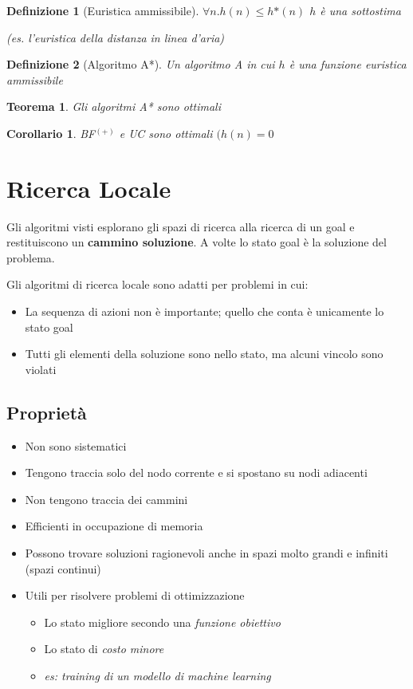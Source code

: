 \documentclass{article}
\newtheorem{definizione}{Definizione}
\newtheorem{theorem}{Teorema}
\newtheorem{corollary}{Corollario}
\begin{document}
\begin{definizione}[Euristica ammissibile]
$\forall n.h(n) \leq h\text{*}(n)$ \quad $h$ è una sottostima
\end{definizione}
\begin{center} \textit{(es. l'euristica della distanza in linea d'aria)}\end{center}
\begin{definizione}[Algoritmo A*]
Un algoritmo A in cui $h$ è una funzione euristica ammissibile
\end{definizione}
\begin{theorem}
Gli algoritmi A* sono \textit{ottimali}
\end{theorem}
\begin{corollary}
BF$^{(+)}$ e UC sono ottimali $(h(n)=0$
\end{corollary}

\section{Ricerca Locale}
Gli algoritmi visti esplorano gli spazi di ricerca alla ricerca di un goal e restituiscono un \textbf{cammino soluzione}. A volte lo stato goal è la soluzione del problema. 

Gli algoritmi di ricerca locale sono adatti per problemi in cui:
\begin{itemize}
    \item La sequenza di azioni non è importante; quello che conta è unicamente lo stato goal
    \item Tutti gli elementi della soluzione sono nello stato, ma alcuni vincolo sono violati
\end{itemize}
\subsection{Proprietà}
\begin{itemize}
    \item Non sono sistematici
    \item Tengono traccia solo del nodo corrente e si spostano su nodi adiacenti
    \item Non tengono traccia dei cammini
    \item Efficienti in occupazione di memoria
    \item Possono trovare soluzioni ragionevoli anche in spazi molto grandi e infiniti (spazi continui)
    \item Utili per risolvere problemi di ottimizzazione
    \begin{itemize}
        \item Lo stato migliore secondo una \textit{funzione obiettivo}
        \item Lo stato di \textit{costo minore}
        \item \textit{es: training di un modello di machine learning}
    \end{itemize}
\end{itemize}
\newpage
\end{document}
